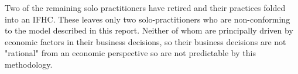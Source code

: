 \documentclass[11pt,a4paper]{article}
\begin{document}
Two of the remaining solo practitioners have retired and their practices folded into an IFHC. These leaves only two solo-practitioners who are non-conforming to the model described in this report. Neither of whom are principally driven by economic factors in their business decisions, so their business decisions are not "rational" from an economic perspective so are not predictable by this methodology.\\ 

\pagebreak


\end{document}
